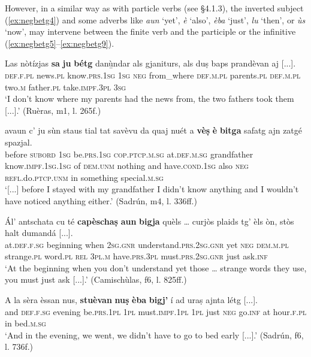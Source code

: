 However, in a similar way as with particle verbs (see §4.1.3), the inverted subject (\ref{ex:negbetg4}) and some adverbs like \textit{aun} `yet', \textit{è} `also', \textit{èba} `just', \textit{lu} `then', or \textit{ùs} `now', may intervene between the finite verb and the participle or the infinitive (\ref{ex:negbetg5}--\ref{ex:negbetg9}).

\ea
\label{ex:negbetg4}
\gll Las nòtízjas \textbf{sa} \textbf{ju} \textbf{bétg} danù̱ndar als gjaniturs, als duṣ baps prandèvan aj [...]. \\
\textsc{def.f.pl} news.\textsc{pl} know.\textsc{prs.1sg} \textsc{1sg} \textsc{neg} from\_where \textsc{def.m.pl} parents.\textsc{pl} \textsc{def.m.pl} two.\textsc{m} father.\textsc{pl} take.\textsc{impf.3pl} \textsc{3sg}\\
\glt `I don’t know where my parents had the news from, the two fathers took them [...].' (Ruèras, m1, l. 265f.)
\z

\ea
\label{ex:negbetg5}
\gll  [...] avaun c’ ju sùn staus tial tat savèvu da quaj nuét a \textbf{vèṣ} \textbf{è} \textbf{bitga} safatg ajn zatgé spazjal.  \\
{} before \textsc{subord} \textsc{1sg} be.\textsc{prs.1sg} \textsc{cop.ptcp.m.sg} at.\textsc{def.m.sg} grandfather know.\textsc{impf.1sg.1sg} of \textsc{dem.unm} nothing and have.\textsc{cond.1sg} also \textsc{neg} \textsc{refl.}do.\textsc{ptcp.unm} in something special.\textsc{m.sg}\\
\glt `[...] before I stayed with my grandfather I didn’t know anything and I wouldn’t have noticed anything either.' (Sadrún, m4, l. 336ff.)
\z

\ea
\label{ex:negbetg6}
\gll    Ál’ antschata cu té \textbf{capèschaṣ} \textbf{aun} \textbf{bigja} quèls … curjòs plaids tg’ èls òn, stòs halt dumandá [...].\\
at.\textsc{def.f.sg} beginning when \textsc{2sg.gnr} understand.\textsc{prs.2sg.gnr} yet \textsc{neg} \textsc{dem.m.pl} {} strange.\textsc{pl} word.\textsc{pl} \textsc{rel} \textsc{3pl.m} have.\textsc{prs.3pl} must.\textsc{prs.2sg.gnr} just ask.\textsc{inf}\\
\glt `At the beginning when you don’t understand yet those … strange words they use, you must just ask [...].' (Camischùlas, f6, l. 825ff.)
\z

\ea
\label{ex:negbetg7}
\gll    A la sèra èssan nus, \textbf{stuèvan} \textbf{nuṣ} \textbf{èba} \textbf{bigj’} í ad uraṣ ajnta létg [...].\\
and \textsc{def.f.sg} evening be.\textsc{prs.1pl} \textsc{1pl} must.\textsc{impf.1pl} \textsc{1pl} just \textsc{neg} go.\textsc{inf} at hour.\textsc{f.pl} in  bed.\textsc{m.sg}\\
\glt `And in the evening, we went, we didn’t have to go to bed early [...].' (Sadrún, f6, l. 736f.)
\z

